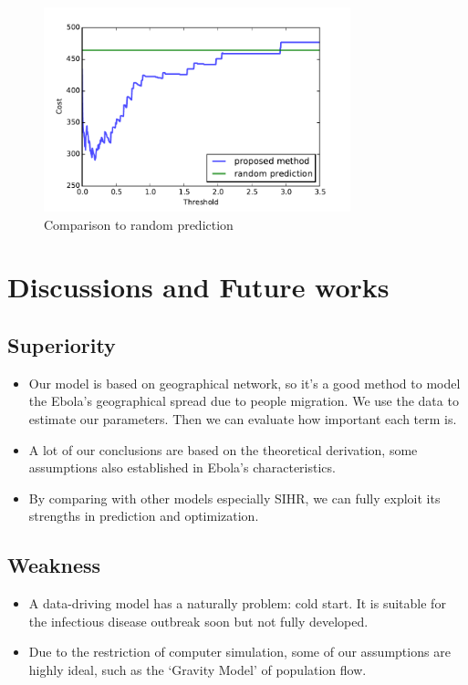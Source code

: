 \documentclass[11pt]{article}
\begin{document}
\begin{figure}[hbtp]
\begin{center}
  \includegraphics[width=3.5in]{graph/cost.pdf}
  \caption{Comparison to random prediction}
  \label{random}
\end{center}  
\end{figure}



\section{Discussions and Future works}

\subsection{ Superiority}
\begin{itemize}

\item 	Our model is based on geographical network, so it's a good method to model the Ebola's geographical spread due to people migration. We use the data to estimate our parameters. Then we can evaluate how important each term is.

\item 	A lot of our conclusions are based on the theoretical derivation, some assumptions also established in Ebola's characteristics. 

\item 	By comparing with other models especially SIHR, we can fully exploit its strengths in prediction and optimization. 


\end{itemize}


\subsection{ Weakness }
\begin{itemize}

\item	A data-driving model has a naturally problem: cold start. It is suitable for the infectious disease outbreak soon but not fully developed.

\item	Due to the restriction of computer simulation, some of our assumptions are highly ideal, such as the `Gravity Model' of population flow.
\end{itemize}
\end{document}
